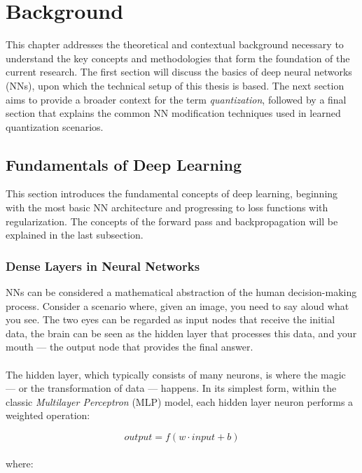 \chapter{Background\label{cha:chapter2}}
This chapter addresses the theoretical and contextual background 
necessary to understand the key concepts and methodologies 
that form the foundation of the current research.
The first section will discuss the basics of deep neural networks (NNs), 
upon which the technical setup of this thesis is based.
The next section aims to provide a broader context for the term \textit{quantization}, 
followed by a final section that explains the common NN modification techniques 
used in learned quantization scenarios.

\section{Fundamentals of Deep Learning}
\label{sec:section2}
This section introduces the fundamental concepts of deep learning, 
beginning with the most basic NN architecture and progressing to loss functions with regularization. 
The concepts of the forward pass and backpropagation will be explained in the last subsection.

\subsection{Dense Layers in Neural Networks}
\label{subsec:subsection1}
NNs can be considered a mathematical abstraction of the human decision-making process. 
Consider a scenario where, given an image, you need to say aloud what you see. 
The two eyes can be regarded as input nodes that receive the initial data, 
the brain can be seen as the hidden layer that processes this data, 
and your mouth — the output node that provides the final answer.
\\
\\
The hidden layer, which typically consists of many neurons, is where the magic
 — or the transformation of data — happens. In its simplest form, 
 within the classic \textit{Multilayer Perceptron} (MLP) model,
 each hidden layer neuron performs a weighted operation:

\[
\textit{output} = f(w \cdot \textit{input} + b)
\]
\\
\noindent where:

